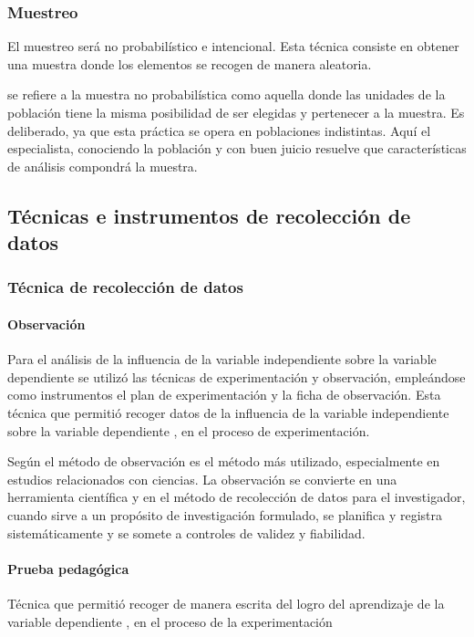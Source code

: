 \documentclass[12pt,a4paper]{article}
\begin{document}
\subsubsection{Muestreo}

El muestreo será no probabilístico e intencional. Esta técnica consiste  en obtener una muestra donde los elementos  se recogen de manera aleatoria.

\cite{alzina_metodologiinvestigacion_2004} se refiere a la muestra no probabilística como aquella donde las unidades de la población tiene la misma posibilidad de ser elegidas y pertenecer a la muestra. Es deliberado, ya que esta práctica se opera en poblaciones indistintas. Aquí el especialista, conociendo la población y con buen juicio resuelve que características de análisis compondrá la muestra.


\subsection{Técnicas e instrumentos de recolección de datos}

\subsubsection{Técnica de recolección de datos}

\paragraph{Observación} Para el análisis de la influencia de la variable independiente sobre la variable dependiente se utilizó las técnicas de experimentación y observación, empleándose como instrumentos el plan de experimentación y la ficha de observación. Esta técnica que permitió recoger datos de la influencia de la variable independiente \MakeTextLowercase{\variablei} sobre la variable dependiente \MakeTextLowercase{\variabled}, en el proceso de experimentación.


%
Según \cite{paz_metodologiinvestigacion_2014} el método de observación es el método más utilizado, especialmente en estudios relacionados con ciencias. La observación se convierte en una herramienta científica y en el método de recolección de datos para el investigador, cuando sirve a un propósito de investigación formulado, se planifica y registra sistemáticamente y se somete a controles de validez y fiabilidad.

\paragraph{Prueba pedagógica} Técnica que permitió recoger de manera escrita del  \MakeTextLowercase{\variablei} logro del aprendizaje de la variable dependiente \MakeTextLowercase{\variabled}, en el proceso de la experimentación
\end{document}

